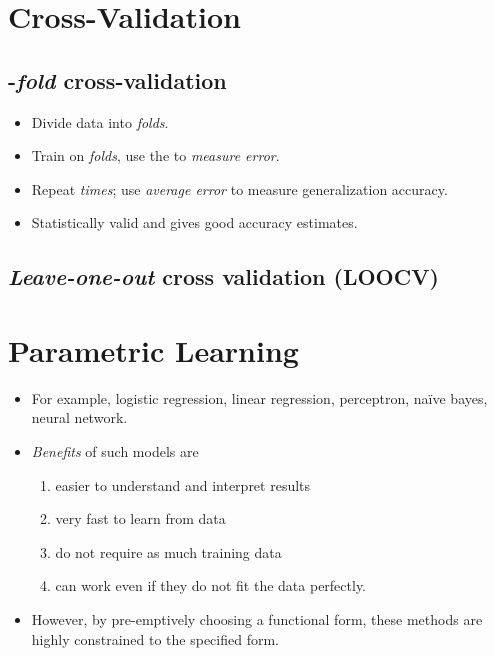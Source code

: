 \documentclass[
	title={ML Fundamentals}
]{cs584notes}
\begin{document}
\section{Cross-Validation}\label{sec:cross-validation}
\subsection{-\emph{fold} cross-validation}\label{subsec:k-fold-cross-validation}
\begin{itemize}
	\item Divide data into  \emph{folds}.
	\item Train on  \emph{folds}, use the  to \emph{measure error}.
	\item Repeat  \emph{times}; use \emph{average error} to measure generalization accuracy.
	\item Statistically valid and gives good accuracy estimates.
\end{itemize}

\subsection{\emph{Leave-one-out} cross validation (LOOCV)}\label{subsec:loocv}

\section{Parametric Learning}\label{sec:parametric-learning}
\begin{itemize}
	\item For example, logistic regression, linear regression, perceptron, na\"ive bayes, neural network.
	\item \emph{Benefits} of such models are
	\begin{enumerate}[label=(\alph*)]
		\item easier to understand and interpret results
		\item very fast to learn from data
		\item do not require as much training data
		\item can work even if they do not fit the data perfectly.
	\end{enumerate}
	\item However, by pre-emptively choosing a functional form, these methods are highly constrained to the specified form.
\end{itemize}
\end{document}
